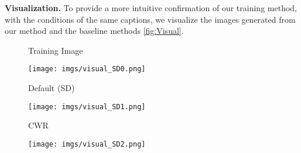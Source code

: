 \textbf{Visualization.} To provide a more intuitive confirmation of our training method, with the conditions of the same captions, we visualize the images generated from our
method and the baseline methods  \cref{fig:Visual}.
\begin{figure}[t]
    \centering
    \setlength{\abovecaptionskip}{12pt} %
  \setlength{\belowcaptionskip}{2pt} %

    \begin{minipage}{0.2\linewidth}
        \centering
        Training Image
    \end{minipage}%
    \hspace{1em} %
    \begin{minipage}{0.7\linewidth}
        \centering
        \texttt{[image: imgs/visual\_SD0.png]} %
    \end{minipage}

    \vspace{1em}

    \begin{minipage}{0.2\linewidth}
        \centering
    Default (SD)~\cite{rombach2022high} 
    \end{minipage}%
    \hspace{1em} %
    \begin{minipage}{0.7\linewidth}
        \centering
        \texttt{[image: imgs/visual\_SD1.png]} %
    \end{minipage}
    
    \vspace{1em}
    \begin{minipage}{0.2\linewidth}
        \centering
        CWR~\cite{somepalli2024understanding}
    \end{minipage}%
    \hspace{1em} %
    \begin{minipage}{0.7\linewidth}
        \centering
        \texttt{[image: imgs/visual\_SD2.png]} %
    \end{minipage}
    

\end{figure}
